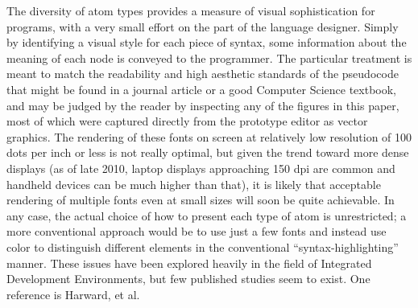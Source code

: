 The diversity of atom types provides a measure of visual sophistication for programs, with a very small effort on the part of the language designer. Simply by identifying a visual style for each piece of syntax, some information about the meaning of each node is conveyed to the programmer. The particular treatment is meant to match the readability and high aesthetic standards of the pseudocode that might be found in a journal article or a good Computer Science textbook, and may be judged by the reader by inspecting any of the figures in this paper, most of which were captured directly from the prototype editor as vector graphics. The rendering of these fonts on screen at relatively low resolution of 100 dots per inch or less is not really optimal, but given the trend toward more dense displays (as of late 2010, laptop displays approaching 150 dpi are common and handheld devices can be much higher than that), it is likely that acceptable rendering of multiple fonts even at small sizes will soon be quite achievable. In any case, the actual choice of how to present each type of atom is unrestricted; a more conventional approach would be to use just a few fonts and instead use color to distinguish different elements in the conventional ``syntax-highlighting'' manner.\cite{lexx} These issues have been explored heavily in the field of Integrated Development Environments, but few published studies seem to exist. One reference is Harward, et al.\cite{insitu}


%  
%  

  

